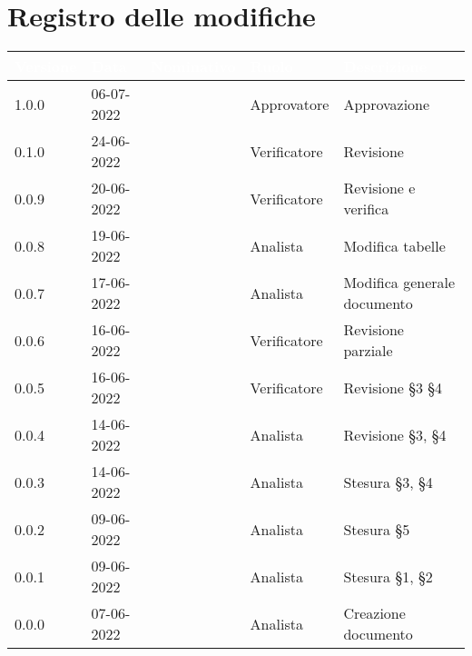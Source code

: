 \section*{Registro delle modifiche}
{

\newlength{\freewidth}
\setlength{\freewidth}{\dimexpr\textwidth-10\tabcolsep}
\renewcommand{\arraystretch}{1.5}
\centering
\setlength{\aboverulesep}{0pt}
\setlength{\belowrulesep}{0pt}
\begin{longtable}{C{.13\freewidth} C{.15\freewidth} C{.26\freewidth} C{.18\freewidth} C{.282379\freewidth}}
	\toprule
{}
\textcolor{white}{\textbf{Versione}}&
\textcolor{white}{\textbf{Data}}&
\textcolor{white}{\textbf{Nominativo}}&
\textcolor{white}{\textbf{Ruolo}}&
\textcolor{white}{\textbf{Descrizione}}\\	
\toprule
\endhead


1.0.0 & 06-07-2022 & \marcov{} & Approvatore & Approvazione \\
0.1.0 & 24-06-2022 & \giulio{} & Verificatore & Revisione \\
0.0.9 & 20-06-2022 & \angela{} & Verificatore & Revisione e verifica \\
0.0.8 & 19-06-2022 & \matteo{} & Analista & Modifica tabelle \\
0.0.7 & 17-06-2022 & \matteo{} & Analista & Modifica generale documento \\
0.0.6 & 16-06-2022 & \angela{} & Verificatore & Revisione parziale \\
0.0.5 & 16-06-2022 & \marcob{} & Verificatore & Revisione \S 3 \S 4 \\
0.0.4 & 14-06-2022 & \matteo{} & Analista & Revisione \S 3, \S 4\\
0.0.3 & 14-06-2022 & \ruth{} & Analista & Stesura \S 3, \S 4\\
0.0.2 & 09-06-2022 & \matteo{} & Analista & Stesura \S 5\\
0.0.1 & 09-06-2022 & \marcob{} & Analista & Stesura \S 1, \S 2\\
0.0.0 & 07-06-2022 & \matteo{} & Analista & Creazione documento\\	
\bottomrule
\end{longtable}
}
